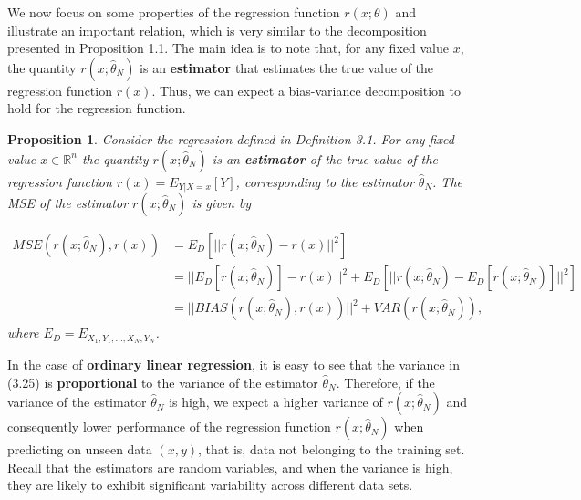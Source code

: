 \documentclass{report}
\newtheorem{proposition}{Proposition}[chapter]
\begin{document}
We now focus on some properties of the regression function $r(x;\theta)$ and illustrate an important relation, which is very similar to the decomposition presented in Proposition 1.1. The main idea is to note that, for any fixed value $x$, the quantity $r(x;\hat{\theta}_N)$ is an \textbf{estimator} that estimates the true value of the regression function $r(x)$. Thus, we can expect a bias-variance decomposition to hold for the regression function.

\begin{proposition}
Consider the regression defined in Definition 3.1. For any fixed value $x \in \mathbb{R}^n$ the quantity $r(x;\hat{\theta}_N)$ is an \textbf{estimator} of the true value of the regression function $r(x) = E_{Y|X = x}[Y]$, corresponding to the estimator $\hat{\theta}_N$. The MSE of the estimator $r(x;\hat{\theta}_N)$ is given by

\begin{equation}
\begin{split}
MSE(r(x;\hat{\theta}_N),r(x)) &= E_D[||r(x;\hat{\theta}_N) - r(x)||^2] \\
&=||E_D[r(x;\hat{\theta}_N)] - r(x)||^2+E_D[||r(x;\hat{\theta}_N) - E_D[r(x;\hat{\theta}_N)]||^2]\\
&=||BIAS(r(x;\hat{\theta}_N), r(x))||^2 + VAR(r(x;\hat{\theta}_N)),
\end{split}
\end{equation}
where $E_D = E_{X_1,Y_1,\dots,X_N,Y_N}$.
\end{proposition}
In the case of \textbf{ordinary linear regression}, it is easy to see that the variance in (3.25) is \textbf{proportional} to the variance of the estimator $\hat{\theta}_N$. Therefore, if the variance of the estimator $\hat{\theta}_N$ is high, we expect a higher variance of $r(x;\hat{\theta}_N)$ and consequently lower performance of the regression function $r(x;\hat{\theta}_N)$ when predicting on unseen data $(x, y)$, that is, data not belonging to the training set. Recall that the estimators are random variables, and when the variance is high, they are likely to exhibit significant variability across different data sets.
\end{document}
